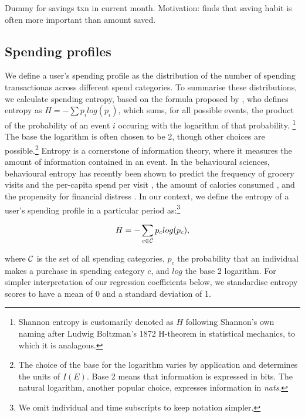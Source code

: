 Dummy for savings txn in current month. Motivation: \citet{mps2018building} finds that
saving habit is often more important than amount saved.


\subsection{Spending profiles}%
\label{sub:spending_profiles}

We define a user's spending profile as the distribution of the number of
spending transactionas across different spend categories. To summarise these
distributions, we calculate spending entropy, based on the formula proposed by
\citet{shannon1948mathematical}, who defines entropy as $H =
-\sum{p_i}log(p_i)$, which sums, for all possible events, the product of the
probability of an event $i$ occuring with the logarithm of that probability.
\footnote{Shannon entropy is customarily denoted as $H$ following Shannon's own
    naming after Ludwig Boltzman's 1872 H-theorem in statistical mechanics, to
    which it is analagous.} The base the logarithm is often chosen to be 2,
    though other choices are possible.\footnote{The choice of the base for the
    logarithm varies by application and determines the units of $I(E)$.  Base 2
means that information is expressed in bits. The natural logarithm, another
popular choice, expresses information in \textit{nats}.} Entropy is a
cornerstone of information theory, where it measures the amount of information
contained in an event. In the behavioural sciences, behavioural entropy has
recently been shown to predict the frequency of grocery visits and the
per-capita spend per visit \citep{guidotti2015behavioral}, the amount of
calories consumed \citep{skatova2019those}, and the propensity for financial
distress \citep{muggleton2020evidence}. In our context, we define the entropy
of a user's spending profile in a particular period as:\footnote{We omit
individual and time subscripts to keep notation simpler.}

\begin{equation}
\label{equ:entropy}
H = -\sum_{c \in \mathcal{C}}{p_c}log(p_c),
\end{equation}

\noindent where $\mathcal{C}$ is the set of all spending categories, $p_c$ the
probability that an individual makes a purchase in spending category $c$, and
$log$ the base 2 logarithm. For simpler interpretation of our regression
coefficients below, we standardise entropy scores to have a mean of 0 and a
standard deviation of 1.

